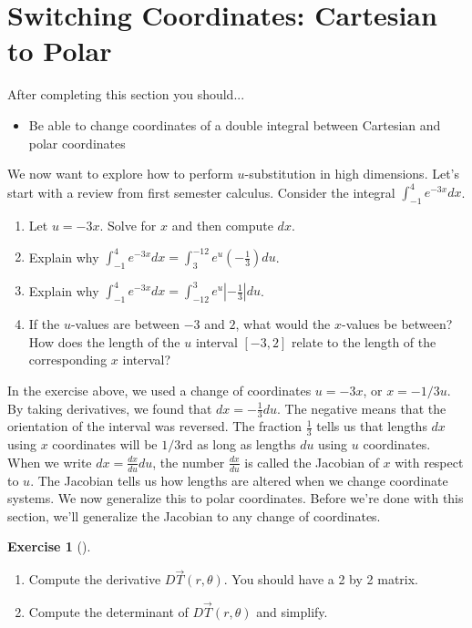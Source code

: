 \documentclass[10pt,]{book}
\theoremstyle{plain}
\theoremstyle{definition}
\theoremstyle{definition}
\theoremstyle{definition}
\theoremstyle{definition}
\newtheorem{exploration}[project]{Exercise}
\theoremstyle{definition}
\numberwithin{equation}{section}
\newcommand{\ds}{\displaystyle}
\begin{document}
\section[{Switching Coordinates: Cartesian to Polar}]{Switching Coordinates: Cartesian to Polar}\label{section-39}
After completing this section you should... \leavevmode%
\begin{itemize}[label=\textbullet]
\item{}Be able to change coordinates of a double integral between Cartesian and polar coordinates%
\end{itemize}
%
\par
We now want to explore how to perform \(u\)-substitution in high dimensions. Let's start with a review from first semester calculus.%
Consider the integral \(\ds\int_{-1}^4 e^{-3x} dx\). \leavevmode%
\begin{enumerate}
\item\hypertarget{li-184}{}Let \(u=-3x\).  Solve for \(x\) and then compute \(dx\).%
\item\hypertarget{li-185}{}Explain why \(\ds\int_{-1}^4 e^{-3x} dx=\int_{3}^{-12}e^u \left(-\frac{1}{3}\right)du\).%
\item\hypertarget{li-186}{}Explain why \(\ds\int_{-1}^4 e^{-3x} dx=\int_{-12}^{3}e^u \left|-\frac{1}{3}\right| du\).%
\item\hypertarget{li-187}{}If the \(u\)-values are between \(-3\) and \(2\), what would the \(x\)-values be between? How does the  length of the \(u\) interval \([-3,2]\) relate to the length of the corresponding \(x\) interval?%
\end{enumerate}
%
In the exercise above, we used a change of coordinates \(u=-3x\), or \(x=-1/3 u\). By taking derivatives, we found that \(dx=-\frac{1}{3}du\). The negative means that the orientation of the interval was reversed. The fraction \(\frac13\) tells us that lengths \(dx\) using \(x\) coordinates will be \(1/3\)rd as long as lengths \(du\) using \(u\) coordinates. When we write \(dx = \frac{dx}{du}du\), the number \(\frac{dx}{du}\) is called the Jacobian of \(x\) with respect to \(u\). The Jacobian tells us how lengths are altered when we change coordinate systems. We now generalize this to polar coordinates. Before we're done with this section, we'll generalize the Jacobian to any change of coordinates.%
\begin{exploration}[]\label{exploration-263}
\leavevmode%
\begin{enumerate}[font=\bfseries,label=(\alph*),ref=\alph*]
\item\label{task-714} Compute the derivative \(D\vec T(r,\theta)\).  You should have a 2 by 2 matrix.%
\item\label{task-715} Compute the determinant of \(D\vec T(r,\theta)\) and simplify.%
\end{enumerate}
\end{exploration}
\end{document}
